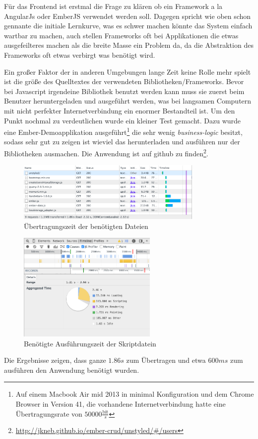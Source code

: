 \documentclass[12pt,twoside]{book}
\begin{document}
Für das Frontend ist erstmal die Frage zu klären ob ein Framework a la AngularJs oder EmberJS verwendet werden soll. Dagegen spricht wie oben schon gennante die initiale Lernkurve, was es schwer machen könnte das System einfach wartbar zu machen, auch stellen Frameworks oft bei Applikationen die etwas ausgefeilteres machen als die breite Masse ein Problem da, da die Abstraktion des Frameworks oft etwas verbirgt was benötigt wird.

Ein großer Faktor der in anderen Umgebungen lange Zeit keine Rolle mehr spielt ist die größe des Quelltextes der verwendeten Bibliotheken/Frameworks. Bevor bei Javascript irgendeine Bibliothek benutzt werden kann muss sie zuerst beim Benutzer heruntergeladen und ausgeführt werden, was bei langsamen Computern mit nicht perfekter Internetverbindung ein enormer Bestandteil ist. Um den Punkt nochmal zu verdeutlichen wurde ein kleiner Test gemacht. Dazu wurde eine Ember-Demoapplikation ausgeführt\footnote{Auf einem Macbook Air mid 2013 in minimal Konfiguration und dem Chrome Browser in Version 41, die vorhandene Internetverbindung hatte eine Übertragungsrate von $50000 \frac{\text{bit}}{s}$} die sehr wenig \textit{business-logic} besitzt, sodass sehr gut zu zeigen ist wieviel das herunterladen und ausführen nur der Bibliotheken ausmachen.
Die Anwendung ist auf github zu finden\footnote{\url{http://jkneb.github.io/ember-crud/unstyled/\#/users}}.
\begin{figure}[H]
    \centering
    \includegraphics[width=0.8\textwidth]{images/performance_1.png}
    \caption{Übertragungszeit der benötigten Dateien}
    \label{fig:awesome_image}
\end{figure}
\begin{figure}[H]
    \centering
    \includegraphics[width=0.6\textwidth]{images/performance_2.png}
    \caption{Benötigte Ausführungszeit der Skriptdatein}
    \label{fig:awesome_image}
\end{figure}
Die Ergebnisse zeigen, dass ganze $1.86s$ zum Übertragen und etwa $600ms$ zum ausführen den Anwendung benötigt wurden.
\end{document}
